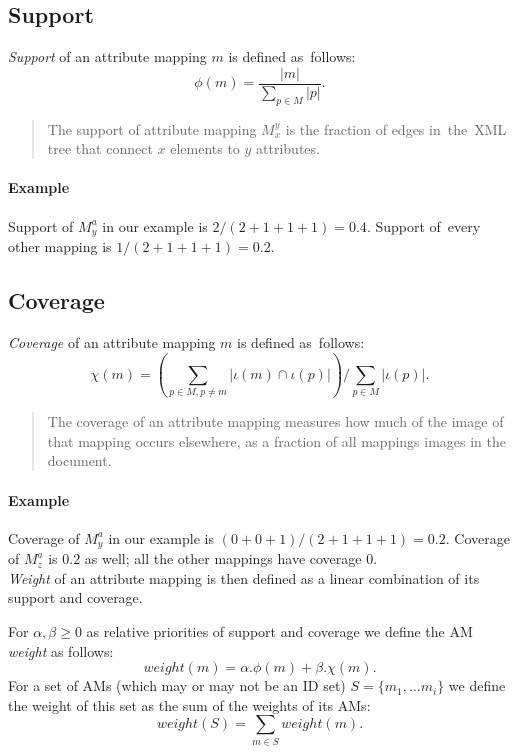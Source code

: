 \subsection{Support}

\begin{define}[Support]
\textit{Support} of an attribute mapping $m$ is defined as~follows:
\[\phi(m) = \frac{|m|}{\sum_{p \in M}|p|}.\]
\end{define}

\begin{quote}
The support of attribute mapping $M_x^y$ is the fraction of edges in~the~XML tree that connect $x$ elements to $y$ attributes.
\end{quote}

\paragraph{Example}
Support of $M_{y}^{a}$ in our example is $2 / (2+1+1+1) = 0.4$. Support of~every other mapping is $1 / (2+1+1+1) = 0.2$.\\

\subsection{Coverage}

\begin{define}[Coverage]
\textit{Coverage} of an attribute mapping $m$ is defined as~follows:
\[\chi(m) = \left( \sum_{p \in M, p \neq m} |\iota(m) \cap \iota(p)| \right) / \sum_{p \in M} |\iota(p)|.\]
\end{define}

\begin{quote}
The coverage of an attribute mapping measures how much of the image of that mapping occurs elsewhere, as a fraction of all mappings images in the document.
\end{quote}

\paragraph{Example}
Coverage of $M_{y}^{a}$ in our example is $(0+0+1) / (2+1+1+1) = 0.2$. Coverage of $M_{z}^{a}$ is $0.2$ as well; all the other mappings have coverage $0$.
\\

\textit{Weight} of an attribute mapping is then defined as a linear combination of its support and coverage.

\begin{define}[Weight]
For $\alpha, \beta \geq 0$ as relative priorities of support and coverage we define the AM \textit{weight} as follows:
\[weight(m) = \alpha . \phi(m) + \beta . \chi(m).\]
For a set of AMs (which may or may not be an ID set) $S = \{m_1, \ldots m_i\}$ we define the weight of this set as the sum of the weights of its AMs:
\[weight(S) = \sum_{m \in S} weight(m).\]
\end{define}

